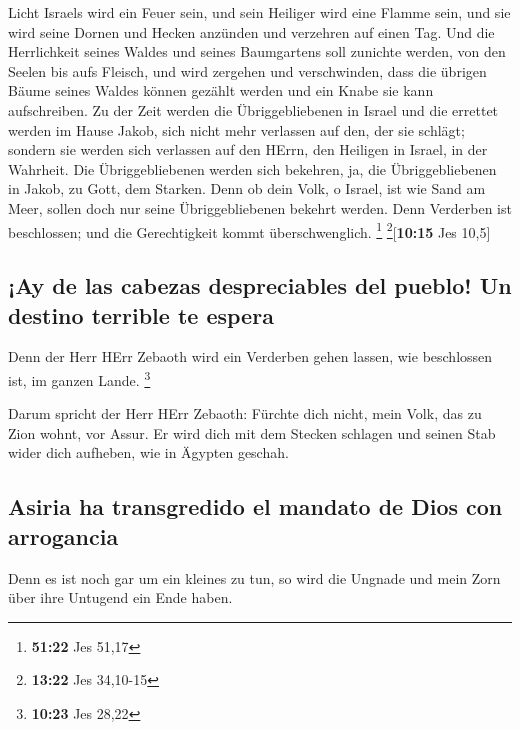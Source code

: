 Licht Israels wird ein Feuer sein, und sein Heiliger wird eine Flamme
sein, und sie wird seine Dornen und Hecken anzünden und verzehren auf
einen Tag.  Und die Herrlichkeit seines Waldes und seines
Baumgartens soll zunichte werden, von den Seelen bis aufs Fleisch, und
wird zergehen und verschwinden,  dass die übrigen Bäume
seines Waldes können gezählt werden und ein Knabe sie kann aufschreiben.
 Zu der Zeit werden die Übriggebliebenen in Israel und
die errettet werden im Hause Jakob, sich nicht mehr verlassen auf den,
der sie schlägt; sondern sie werden sich verlassen auf den HErrn, den
Heiligen in Israel, in der Wahrheit.  Die
Übriggebliebenen werden sich bekehren, ja, die Übriggebliebenen in
Jakob, zu Gott, dem Starken.  Denn ob dein Volk, o
Israel, ist wie Sand am Meer, sollen doch nur seine Übriggebliebenen
bekehrt werden. Denn Verderben ist beschlossen; und die Gerechtigkeit
kommt überschwenglich. \footnote{\textbf{51:22} Jes 51,17}
\footnote{\textbf{13:22} Jes 34,10-15}{[}\textbf{10:15} Jes 10,5{]}

\hypertarget{ay-de-las-cabezas-despreciables-del-pueblo-un-destino-terrible-te-espera}{%
\subsection{¡Ay de las cabezas despreciables del pueblo! Un destino
terrible te
espera}\label{ay-de-las-cabezas-despreciables-del-pueblo-un-destino-terrible-te-espera}}

 Denn der Herr HErr Zebaoth wird ein Verderben gehen
lassen, wie beschlossen ist, im ganzen Lande. \footnote{\textbf{10:23}
  Jes 28,22}

 Darum spricht der Herr HErr Zebaoth: Fürchte dich nicht,
mein Volk, das zu Zion wohnt, vor Assur. Er wird dich mit dem Stecken
schlagen und seinen Stab wider dich aufheben, wie in Ägypten geschah.

\hypertarget{asiria-ha-transgredido-el-mandato-de-dios-con-arrogancia}{%
\subsection{Asiria ha transgredido el mandato de Dios con
arrogancia}\label{asiria-ha-transgredido-el-mandato-de-dios-con-arrogancia}}

 Denn es ist noch gar um ein kleines zu tun, so wird die
Ungnade und mein Zorn über ihre Untugend ein Ende haben.

